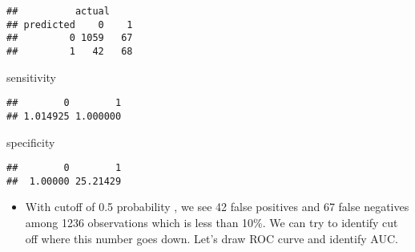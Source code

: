 \documentclass[
]{article}
\newenvironment{Shaded}{\begin{snugshade}}{\end{snugshade}}
\newcommand{\NormalTok}[1]{#1}
\providecommand{\tightlist}{%
  \setlength{\itemsep}{0pt}\setlength{\parskip}{0pt}}
\begin{document}
\begin{verbatim}
##          actual
## predicted    0    1
##         0 1059   67
##         1   42   68
\end{verbatim}

\begin{Shaded}
\begin{Highlighting}[]
\NormalTok{sensitivity}
\end{Highlighting}
\end{Shaded}

\begin{verbatim}
##        0        1 
## 1.014925 1.000000
\end{verbatim}

\begin{Shaded}
\begin{Highlighting}[]
\NormalTok{specificity}
\end{Highlighting}
\end{Shaded}

\begin{verbatim}
##        0        1 
##  1.00000 25.21429
\end{verbatim}

\begin{itemize}
\tightlist
\item
  With cutoff of 0.5 probability , we see 42 false positives and 67
  false negatives among 1236 observations which is less than 10\%. We
  can try to identify cut off where this number goes down. Let's draw
  ROC curve and identify AUC.
\end{itemize}
\end{document}
